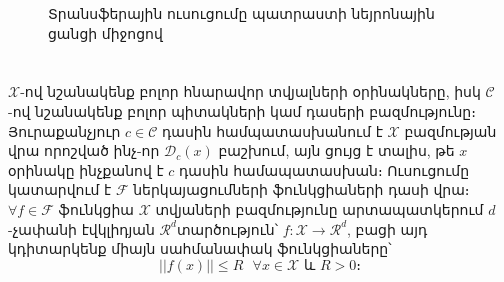 \documentclass[12pt]{article}
\begin{document}
\begin{figure}[h]
\caption{Տրանսֆերային ուսուցումը պատրաստի նեյրոնային ցանցի միջոցով } \label{fig:ml_vs_tl}
\end{figure}









\pagebreak


\section*{
 } \noindent
{}
{}
 
 $\mathcal{X}$-ով նշանակենք բոլոր հնարավոր տվյալների օրինակները, իսկ $\mathcal{C}$-ով նշանակենք բոլոր պիտակների կամ դասերի բազմությունը։ Յուրաքանչյուր $c \in \mathcal{C}$ դասին համպատասխանում է $\mathcal{X}$ բազմության վրա որոշված ինչ-որ $\mathcal{D}_c(x)$ բաշխում, այն ցույց է տալիս, թե $x$ օրինակը ինչքանով է $c$ դասին համապատասխան։ Ուսուցումը կատարվում է $\mathcal{F}$ ներկայացումների ֆունկցիաների դասի վրա։ $\forall f \in \mathcal{F}$  ֆունկցիա $\mathcal{X}$ տվյաների բազմությունը արտապատկերում $d$-չափանի էվկլիդյան $\mathcal{R}^d$տարծություն՝ $f:\mathcal{X}\rightarrow\mathcal{R}^d$, բացի այդ կդիտարկենք միայն սահմանափակ ֆունկցիաները՝
 $$||f(x)|| \leq R \text{    } \forall x \in \mathcal{X} \text{ և } R > 0։$$ 


\end{document}
